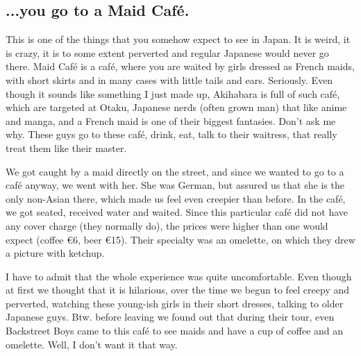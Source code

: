 \begin{post}
\begin{content}
\subsection{...you go to a Maid Café.}
This is one of the things that you somehow expect to see in Japan. It is weird, it is crazy, it is to some extent perverted and regular Japanese would never go there. Maid Café is a café, where you are waited by girls dressed as French maids, with short skirts and in many cases with little tails and ears. Seriously. Even though it sounds like something I just made up, Akihabara is full of such café, which are targeted at Otaku, Japanese nerds (often grown man) that like anime and manga, and a French maid is one of their biggest fantasies. Don't ask me why. These guys go to these café, drink, eat, talk to their waitress, that really treat them like their master.


We got caught by a maid directly on the street, and since we wanted to go to a café anyway, we went with her. She was German, but assured us that she is the only non-Asian there, which made us feel even creepier than before. In the café, we got seated, received water and waited. Since this particular café did not have any cover charge (they normally do), the prices were higher than one would expect (coffee €6, beer €15). Their specialty was an omelette, on which they drew a picture with ketchup.

\begin{figure}
\vspace{-24pt}
\end{figure}

I have to admit that the whole experience was quite uncomfortable. Even though at first we thought that it is hilarious, over the time we begun to feel creepy and perverted, watching these young-ish girls in their short dresses, talking to older Japanese guys. Btw. before leaving we found out that during their tour, even Backstreet Boys came to this café to see maids and have a cup of coffee and an omelette. Well, I don't want it that way.


\end{content}
\end{post}
